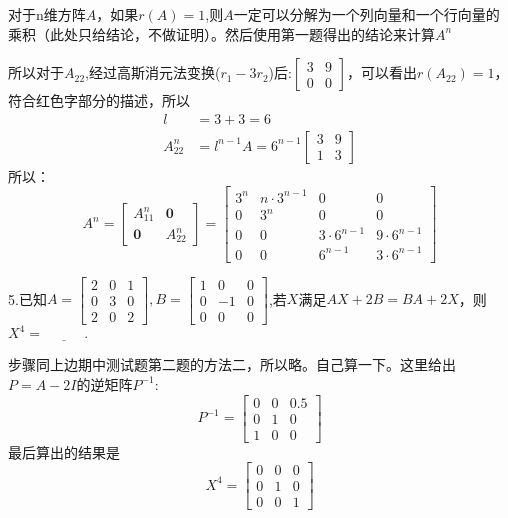 \documentclass{article}
\begin{document}
\begin{jie}
\textcolor[rgb]{1.00,0.00,0.00}{对于n维方阵$A$，如果$r(A)=1$,则$A$一定可以分解为一个列向量和一个行向量的乘积（此处只给结论，不做证明）。然后使用第一题得出的结论来计算$A^{n}$}

所以对于$A_{22}$,经过高斯消元法变换($r_{1}-3r_{2}$)后:$
\begin{bmatrix}
  3 & 9 \\
  0 & 0
\end{bmatrix}
$，可以看出$r(A_{22})=1$，符合红色字部分的描述，所以
\begin{align*}
 l&=3+3=6\\
 A_{22}^{n}&=l^{n-1}A=6^{n-1}
 \begin{bmatrix}
   3 & 9 \\
   1 & 3
 \end{bmatrix}
\end{align*}
所以：
\begin{equation*}
  A^{n}=
\begin{bmatrix}
  A_{11}^{n} & \mathbf{0} \\
  \mathbf{0} & A_{22}^{n}
\end{bmatrix}=
\begin{bmatrix}
  3^{n} & n\cdot3^{n-1}&0&0 \\
  0 & 3^{n}&0&0\\
  0&0&3\cdot6^{n-1}&9\cdot6^{n-1}\\
  0&0&6^{n-1}&3\cdot6^{n-1}
\end{bmatrix}
\end{equation*}
\end{jie}
  5.已知$
  A=
  \begin{bmatrix}
    2&0&1\\
    0&3&0\\
    2&0&2
  \end{bmatrix},
  B=
  \begin{bmatrix}
    1&0&0\\
    0&-1&0\\
    0&0&0
  \end{bmatrix}
  $,若$X$满足$AX+2B=BA+2X$，则$X^{4}=\underline{~~~~~~~~~~~~~}.$

  \begin{jie}
  步骤同上边期中测试题第二题的方法二，所以略。自己算一下。这里给出$P=A-2I$的逆矩阵$P^{-1}$:
  \begin{equation*}
    P^{-1}=
    \begin{bmatrix}
      0 & 0 & 0.5\\
      0 & 1 &0\\
      1&0&0
    \end{bmatrix}
  \end{equation*}
最后算出的结果是
\begin{equation*}
X^{4}=
\begin{bmatrix}
  0 & 0 &0 \\
  0 & 1&0 \\
  0&0&1
\end{bmatrix}
\end{equation*}
  \end{jie}
\end{document}
